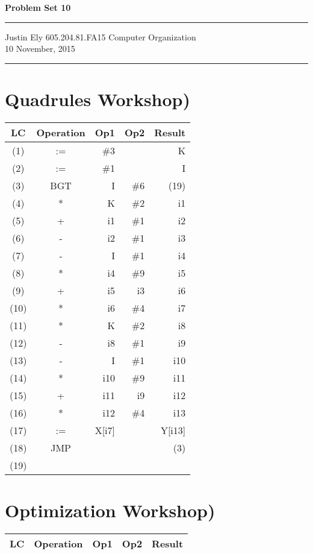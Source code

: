 \documentclass[a4paper,11pt]{article}
\begin{document}
\begin{flushright}

\vspace{1.1cm}

{\bf\Huge Problem Set 10}

\rule{0.25\linewidth}{0.5pt}

\vspace{0.5cm}
Justin Ely
\linebreak
\newline
\footnotesize{605.204.81.FA15 Computer Organization\\}
\vspace{0.5cm}
10 November, 2015
\end{flushright}

\noindent\rule{\linewidth}{1.0pt}



\section*{Quadrules Workshop)}

\begin{tabular}{ | c | c | r | r | r |}
  \hline
    LC & Operation & Op1 & Op2 & Result  \\ \hline
    (1) & := & \#3 & & K \\ \hline
    (2) & := & \#1 & & I \\ \hline
    (3) & BGT & I & \#6 & (19) \\ \hline
    (4) & * & K & \#2 & i1 \\ \hline
    (5) & + & i1 & \#1 & i2 \\ \hline
    (6) & - & i2 & \#1 & i3 \\ \hline
    (7) & - &I & \#1 & i4 \\ \hline
    (8) & * & i4 & \#9 & i5 \\ \hline
    (9) & + &i5 & i3 & i6 \\ \hline
  (10) & * & i6 & \#4 & i7 \\ \hline
   (11) & * & K & \#2 & i8 \\ \hline
   (12) & - & i8 & \#1 & i9 \\ \hline
   (13) & - & I & \#1 & i10 \\ \hline
   (14) & * & i10 & \#9 & i11 \\ \hline
   (15) & + & i11 & i9 & i12 \\ \hline
   (16) & * & i12 & \#4 & i13 \\ \hline
   (17) & := & X[i7] &   & Y[i13] \\ \hline
   (18) & JMP &  &  & (3) \\ \hline
   (19) &   &   &   &  \\ \hline
\end{tabular}


\section*{Optimization Workshop)}
\begin{tabular}{ | c | c | r | r | r |}
  \hline
    LC & Operation & Op1 & Op2 & Result  \\ \hline
\end{tabular}

\end{document}
